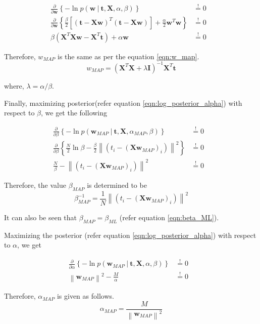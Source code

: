 \documentclass[11pt]{article}
\newcommand\given[1][]{\:#1\vert\:}
\newcommand{\norm}[1]{\left\lVert#1\right\rVert}
\begin{document}
\begin{eqnarray}
    \frac{\partial }{\partial  \bm{w}} \left\{ -\ln{p(\bm{w} \given \bm{t}, \bm{X}, \alpha, \beta)} \right\} 
    &\overset{!}{=} 0& \\
    \frac{\partial }{\partial \bm{w}} \left\{\frac{\beta}{2} \left[ \left(\bm{t} - \bm{X}\bm{w}\right)^T \left(\bm{t} - \bm{X}\bm{w}\right)\right] + \frac{\alpha}{2}\bm{w}^T\bm{w}\right\}
    &\overset{!}{=} 0& \\
    \beta \left( \bm{X}^T\bm{X}\bm{w} - \bm{X}^T \bm{t} \right) + \alpha\bm{w}
    &\overset{!}{=} 0& 
\end{eqnarray}

Therefore, $w_{MAP}$ is the same as per the equation \ref{eqn:w_map}.
\begin{equation}
    w_{MAP} = \left(\bm{X}^T\bm{X} + \lambda\bm{I}\right)^{-1}\bm{X}^T\bm{t}
\end{equation}

where, $\lambda = \alpha/\beta$.

\newpage
Finally, maximizing posterior(refer equation \ref{eqn:log_posterior_alpha}) with respect to $\beta$, we get the following

\begin{eqnarray}
    \frac{\partial }{\partial  \beta} \left\{ -\ln{p(\bm{w}_{MAP} \given \bm{t}, \bm{X}, \alpha_{MAP}, \beta)} \right\} 
    &\overset{!}{=} 0& \\
    \frac{\partial }{\partial \beta} \left\{\frac{N}{2}\ln{\beta} - \frac{\beta}{2} \norm{\left(t_i - (\bm{X}\bm{w}_{MAP})_i\right)}^2  \right\}
    &\overset{!}{=} 0& \\
    \frac{N}{\beta} - \norm{\left(t_i - (\bm{X}\bm{w}_{MAP})_i\right)}^2
    &\overset{!}{=} 0& 
\end{eqnarray}

Therefore, the value $\beta_{MAP}$ is determined to be 
\begin{equation}
    \beta_{MAP}^{-1} = \frac{1}{N}\norm{\left(t_i - (\bm{X}\bm{w}_{MAP})_i\right)}^2
\end{equation}

It can also be seen that $\beta_{MAP} = \beta_{ML}$ (refer equation \ref{eqn:beta_ML}).

Maximizing the posterior (refer equation \ref{eqn:log_posterior_alpha}) with respect to $\alpha$, we get

\begin{eqnarray}
    \frac{\partial }{\partial  \alpha} \left\{ -\ln{p(\bm{w}_{MAP} \given \bm{t}, \bm{X}, \alpha, \beta)} \right\}
    &\overset{!}{=} 0&  \\
    \norm{\bm{w}_{MAP}}^2 - \frac{M}{\alpha}
    &\overset{!}{=} 0& 
\end{eqnarray}

Therefore, $\alpha_{MAP}$ is given as follows.
\begin{equation}
    \alpha_{MAP} = \frac{M}{\norm{\bm{w}_{MAP}}^2}
\end{equation}
\end{document}
